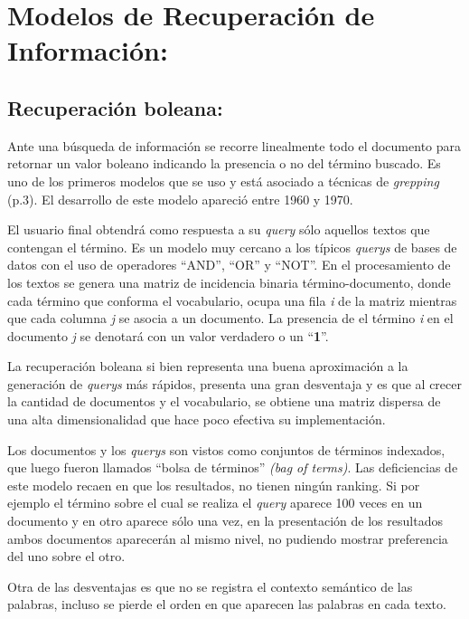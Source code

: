 \documentclass[
  10,
  openany]{book}
\begin{document}
\hypertarget{modelos-de-recuperaciuxf3n-de-informaciuxf3n}{%
\section{Modelos de Recuperación de Información:}\label{modelos-de-recuperaciuxf3n-de-informaciuxf3n}}

\hypertarget{recuperaciuxf3n-boleana}{%
\subsection{Recuperación boleana:}\label{recuperaciuxf3n-boleana}}

Ante una búsqueda de información se recorre linealmente todo el documento para retornar un valor boleano indicando la presencia o no del término buscado. Es uno de los primeros modelos que se uso y está asociado a técnicas de \emph{grepping} \citep{manning2008} (p.3). El desarrollo de este modelo apareció entre 1960 y 1970.

El usuario final obtendrá como respuesta a su \emph{query} sólo aquellos textos que contengan el término. Es un modelo muy cercano a los típicos \emph{querys} de bases de datos con el uso de operadores ``AND'', ``OR'' y ``NOT''. En el procesamiento de los textos se genera una matriz de incidencia binaria término-documento, donde cada término que conforma el vocabulario, ocupa una fila \emph{i} de la matriz mientras que cada columna \emph{j} se asocia a un documento. La presencia de el término \emph{i} en el documento \emph{j} se denotará con un valor verdadero o un ``\textbf{1}''.

La recuperación boleana si bien representa una buena aproximación a la generación de \emph{querys} más rápidos, presenta una gran desventaja y es que al crecer la cantidad de documentos y el vocabulario, se obtiene una matriz dispersa de una alta dimensionalidad que hace poco efectiva su implementación.

Los documentos y los \emph{querys} son vistos como conjuntos de términos indexados, que luego fueron llamados ``bolsa de términos'' \emph{(bag of terms)}. Las deficiencias de este modelo recaen en que los resultados, no tienen ningún ranking. Si por ejemplo el término sobre el cual se realiza el \emph{query} aparece 100 veces en un documento y en otro aparece sólo una vez, en la presentación de los resultados ambos documentos aparecerán al mismo nivel, no pudiendo mostrar preferencia del uno sobre el otro.

Otra de las desventajas es que no se registra el contexto semántico de las palabras, incluso se pierde el orden en que aparecen las palabras en cada texto.
\end{document}

